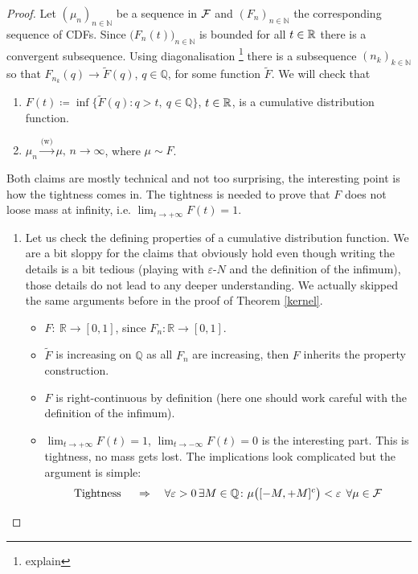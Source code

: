 \begin{proof}[Proof]
	Let $(\mu_n)_{n\in\mathbb{N}}$ be a sequence in $\mathcal{F}$ and $(F_n)_{n\in \mathbb{N}}$ the corresponding sequence of CDFs. Since $\big( F_n(t)\big)_{n\in\mathbb{N}}$ is bounded for all $t\in\mathbb{R}$ there is a convergent subsequence. Using diagonalisation \footnote{explain} there is a subsequence $(n_k)_{k\in\mathbb{N}}$ so that $F_{n_k}(q) \to \tilde{F}(q)$, $q\in\mathbb{Q}$, for some function $\tilde{F}$. We will check that
	\begin{enumerate}[label=(\roman*)]
		\item
			$F(t) \coloneqq \inf \big\{ \tilde{F}(q) \colon q > t, \: q\in \mathbb{Q}\big\}$, $t\in\mathbb{R}$, is a cumulative distribution function.
		\item
			$\mu_n \overset{\text{(w)}}{\longrightarrow} \mu,\,n\to\infty$, where $\mu\sim F$.
	\end{enumerate}
	Both claims are mostly technical and not too surprising, the interesting point is how the tightness comes in. The tightness is needed to prove that $F$ does not loose mass at infinity, i.e. $\lim_{t\to+\infty} F(t)=1$.
	\begin{enumerate}[label=(\roman*)]
		\item Let us check the defining properties of a cumulative distribution function. We are a bit sloppy for the claims that obviously hold even though writing the details is a bit tedious (playing with $\varepsilon$-$N$ and the definition of the infimum), those details do not lead to any deeper understanding. We actually skipped the same arguments before in the proof of Theorem \ref{kernel}.
			\begin{itemize}
				\item $F\colon \:\mathbb{R} \to [0,1]$, since $F_n \colon \mathbb{R}\to [0,1]$.
				\item $\tilde{F}$ is increasing on $\mathbb{Q}$ as all $F_n$ are increasing, then $F$ inherits the property construction.
				\item $F$ is right-continuous by definition (here one should work careful with the definition of the infimum).
				\item $\lim_{t\to+\infty}F(t) = 1$, $\lim_{t \to-\infty}F(t) = 0$ is the interesting part. This is tightness, no mass gets lost. The implications look complicated but the argument is simple:
					\begin{align*}
						\text{Tightness } \quad 
						&\Rightarrow\quad \forall \varepsilon > 0 \,\exists M\in \Q\colon \mu \big( [ -M,+M]^c \big) < \varepsilon \:\: \forall \mu \in \cF \\

\end{align*}
\end{itemize}
\end{enumerate}
\end{proof}
